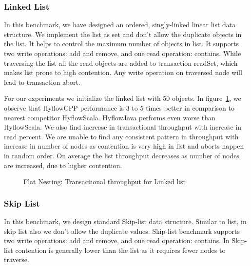 \documentclass[12pt,english]{report}
\begin{document}
\subsubsection{Linked List}

In this benchmark, we have designed an ordered, singly-linked linear list data structure. We implement the list as set and don't allow the duplicate objects in the list. It helps to control the maximum number of objects in list. It supports two write operations: add and remove, and one read operation: contains. While traversing the list all the read objects are added to transaction readSet, which makes list prone to high contention. Any write operation on traversed node will lead to transaction abort.

For our experiments we initialize the linked list with 50 objects. In figure~\ref{Fig:flatList}, we observe that HyflowCPP performance is 3 to 5 times better in comparison to nearest competitor HyflowScala. HyflowJava performs even worse than HyflowScala. We also find increase in transactional throughput with increase in read percent. We are unable to find any consistent pattern in throughput with increase in number of nodes as contention is very high in list and aborts happen in random order. On average the list throughput decreases as number of nodes are increased, due to higher contention.

\begin{figure}[H]
\centering
{}
\end{figure}
\begin{figure}[H]
\centering
{}
\end{figure}
\begin{figure}[H]
\centering
{}
\caption{Flat Nesting: Transactional throughput for Linked list}
\label{Fig:flatList}
\end{figure}

\subsubsection{Skip List}

In this benchmark, we design standard Skip-list data structure. Similar to list, in skip list also we don't allow the duplicate values. Skip-list benchmark supports two write operations: add and remove, and one read operation: contains. In Skip-list contention is generally lower than the list as it requires fewer nodes to traverse. 
\end{document}
